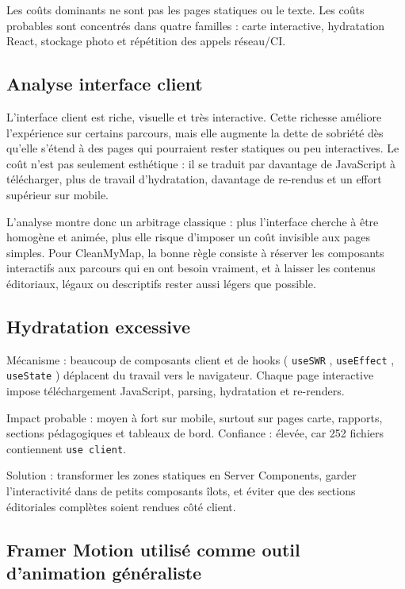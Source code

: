 \documentclass[
  10pt,
  a4paper,
  DIV=11,
  numbers=noendperiod,
  oneside]{scrreprt}
\begin{document}
Les coûts dominants ne sont pas les pages statiques ou le texte. Les
coûts probables sont concentrés dans quatre familles : carte
interactive, hydratation React, stockage photo et répétition des appels
réseau/CI.

\subsection{Analyse interface client}\label{analyse-interface-client}

L'interface client est riche, visuelle et très interactive. Cette
richesse améliore l'expérience sur certains parcours, mais elle augmente
la dette de sobriété dès qu'elle s'étend à des pages qui pourraient
rester statiques ou peu interactives. Le coût n'est pas seulement
esthétique : il se traduit par davantage de JavaScript à télécharger,
plus de travail d'hydratation, davantage de re-rendus et un effort
supérieur sur mobile.

L'analyse montre donc un arbitrage classique : plus l'interface cherche
à être homogène et animée, plus elle risque d'imposer un coût invisible
aux pages simples. Pour CleanMyMap, la bonne règle consiste à réserver
les composants interactifs aux parcours qui en ont besoin vraiment, et à
laisser les contenus éditoriaux, légaux ou descriptifs rester aussi
légers que possible.

\subsection{Hydratation excessive}\label{hydratation-excessive}

Mécanisme : beaucoup de composants client et de hooks ( \texttt{useSWR}
, \texttt{useEffect} , \texttt{useState} ) déplacent du travail vers le
navigateur. Chaque page interactive impose téléchargement JavaScript,
parsing, hydratation et re-renders.

Impact probable : moyen à fort sur mobile, surtout sur pages carte,
rapports, sections pédagogiques et tableaux de bord. Confiance : élevée,
car 252 fichiers contiennent \texttt{use\ client}.

Solution : transformer les zones statiques en Server Components, garder
l'interactivité dans de petits composants îlots, et éviter que des
sections éditoriales complètes soient rendues côté client.

\subsection{Framer Motion utilisé comme outil d'animation
généraliste}\label{framer-motion-utilisuxe9-comme-outil-danimation-guxe9nuxe9raliste}
\end{document}
